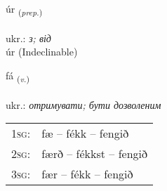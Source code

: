 \documentclass[frontgrid, backgrid]{flacards}\usepackage[]{graphicx}\usepackage[]{xcolor}
\begin{document}
\renewcommand{\flhead}{\vskip5pt \fboxsep=0pt {\small\bfseries\footnotesize Forsetning | прийменник}}
\renewcommand{\fcfoot}{\vskip5pt \fboxsep=0pt \hspace{2pt}{\small\bfseries\footnotesize 1K}}

\renewcommand{\blhead}{\vskip5pt {\small\bfseries\footnotesize Forsetning | прийменник }}
\renewcommand{\bcfoot}{\vskip5pt \hspace{2pt}{\small\bfseries\footnotesize 1K}}


{úr \small{\textsubscript{(\textit{prep.})}} \\[1ex]
\textphonetic{[uːr]} \\
ukr.: \emph{з; від} \\  [2ex]
úr (Indeclinable)}

\renewcommand{\flhead}{\vskip5pt \fboxsep=0pt {\small\bfseries\footnotesize Sagnorð | дієслово}}
\renewcommand{\fcfoot}{\vskip5pt \fboxsep=0pt \hspace{2pt}{\small\bfseries\footnotesize 1K}}

\renewcommand{\blhead}{\vskip5pt {\small\bfseries\footnotesize Sagnorð | дієслово }}
\renewcommand{\bcfoot}{\vskip5pt \hspace{2pt}{\small\bfseries\footnotesize 1K}}


{fá \small{\textsubscript{(\textit{v.})}} \\[1ex] %
\textphonetic{[fauː]} \\
ukr.: \emph{отримувати; бути дозволеним} \\  [2ex]
\renewcommand*{\arraystretch}{0.8}
\begin{tabular}{p{1cm}l}
\textsc{1sg}: & fæ -- fékk -- fengið \\ 
\textsc{2sg}: & færð -- fékkst -- fengið \\ 
\textsc{3sg}: & fær -- fékk -- fengið \\ 
\end{tabular}
}


\renewcommand{\flhead}{\vskip5pt \fboxsep=0pt {\small\bfseries\footnotesize Forsetning | прийменник}}
\renewcommand{\fcfoot}{\vskip5pt \fboxsep=0pt \hspace{2pt}{\small\bfseries\footnotesize 1K}}
\end{document}
